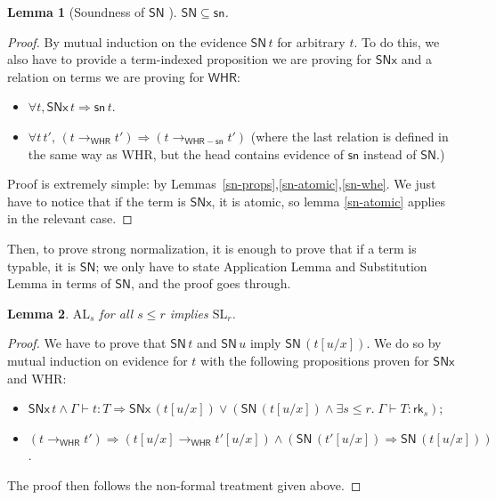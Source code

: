 \documentclass{article}
\newtheorem{lemma}{Lemma}
\theoremstyle{definition}
\theoremstyle{remark}
\begin{document}
\begin{lemma}[Soundness of $\mathsf{SN}$ ]
    $\mathsf{SN}\subseteq\mathsf{sn}$.
\end{lemma}
\begin{proof}
    By mutual induction on the evidence
    $\mathsf{SN}\,t$ for arbitrary $t$. To do this, we
    also have to provide a term-indexed proposition we
    are proving for $\mathsf{SNx}$ and a relation on
    terms we are proving for $\mathsf{WHR}$:
    \begin{itemize}
        \item $\forall t,\mathsf{SNx}\,t\Rightarrow
            \mathsf{sn}\,t$.
        \item $\forall t\,t',\,(t\to_\mathsf{WHR}t')
            \Rightarrow(t\to_\mathsf{WHR-sn}t')$ (where
            the last relation is defined in the same
            way as WHR, but the head contains evidence
            of $\mathsf{sn}$ instead of $\mathsf{SN}$.)
    \end{itemize}
    Proof is extremely simple: by
    Lemmas~\ref{sn-props},\ref{sn-atomic},\ref{sn-whe}.
    We just have to notice that if the term is
    $\mathsf{SNx}$, it is atomic, so lemma
    \ref{sn-atomic} applies in the relevant case.
\end{proof}

Then, to prove strong normalization, it is enough to
prove that if a term is typable, it is $\mathsf{SN}$;
we only have to state Application Lemma and
Substitution Lemma in terms of $\mathsf{SN}$, and the
proof goes through.

\begin{lemma}
    $\mathrm{AL}_s$ for all $s\le r$ implies
    $\mathrm{SL}_r$.
\end{lemma}
\begin{proof}
    We have to prove that $\mathsf{SN}\,t$ and
    $\mathsf{SN}\,u$ imply $\mathsf{SN}\,(t[u/x])$.
    We do so by mutual induction on evidence for $t$
    with the following propositions proven for
    $\mathsf{SNx}$ and WHR:
    \begin{itemize}
        \item $\mathsf{SNx}\,t\land\Gamma\vdash t:T
            \Rightarrow\mathsf{SNx}\,(t[u/x])\lor
            (\mathsf{SN}\,(t[u/x])\land\exists s\le r.
            \;\Gamma\vdash T:\mathsf{rk}_s)$;
        \item $(t\to_\mathsf{WHR}t')\Rightarrow
            (t[u/x]\to_\mathsf{WHR}t'[u/x])\land
            (\mathsf{SN}\,(t'[u/x])\Rightarrow
            \mathsf{SN}\,(t[u/x]))$.
    \end{itemize}
    The proof then follows the non-formal treatment
    given above.
\end{proof}
\end{document}

